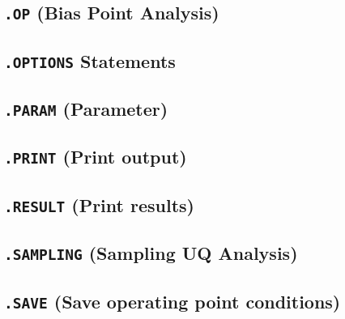 \newpage
\subsection{\texttt{.OP} (Bias Point Analysis)}


\newpage
\subsection{\texttt{.OPTIONS} Statements}


\newpage
\subsection{\texttt{.PARAM} (Parameter)}





\newpage
\subsection{\texttt{.PRINT} (Print output)}\label{.PRINT}


\newpage
\subsection{\texttt{.RESULT} (Print results)}\label{.RESULT}


\newpage
\subsection{\texttt{.SAMPLING} (Sampling UQ Analysis)}\label{.SAMPLING}


\newpage
\subsection{\texttt{.SAVE} (Save operating point conditions)}


